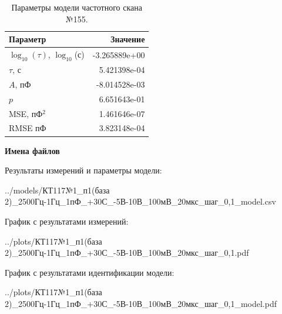 \begin{table}[!ht]
    \centering
    \caption{Параметры модели частотного скана №155.}
    \begin{tabular}{|l|r|}
        \hline
        Параметр                                       & Значение                  \\ \hline
        $\log_{10}(\tau)$, $\log_{10}$(с)              & -3.265889e+00             \\ \hline
        $\tau$, с                                      & 5.421398e-04              \\ \hline
        $A$, пФ                                        & -8.014528e-03             \\ \hline
        $p$                                            & 6.651643e-01              \\ \hline
        MSE, пФ$^2$                                    & 1.461646e-07              \\ \hline
        RMSE пФ                                        & 3.823148e-04              \\ \hline
    \end{tabular}
    \label{table:frequency_scan_model_155}
\end{table}

\textbf{Имена файлов}

Результаты измерений и параметры модели:

\scriptsize../models/КТ117№1\_п1(база 2)\_2500Гц-1Гц\_1пФ\_+30С\_-5В-10В\_100мВ\_20мкс\_шаг\_0,1\_model.csv
\normalsize

График с результатами измерений:

\scriptsize../plots/КТ117№1\_п1(база 2)\_2500Гц-1Гц\_1пФ\_+30С\_-5В-10В\_100мВ\_20мкс\_шаг\_0,1.pdf
\normalsize

График с результатами идентификации модели:

\scriptsize../plots/КТ117№1\_п1(база 2)\_2500Гц-1Гц\_1пФ\_+30С\_-5В-10В\_100мВ\_20мкс\_шаг\_0,1\_model.pdf
\normalsize

